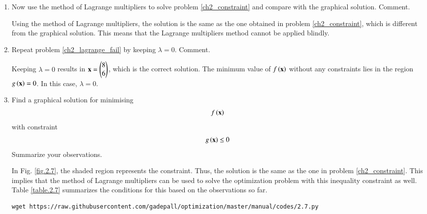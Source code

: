 \documentclass[journal,12pt,twocolumn]{IEEEtran}
\renewcommand\thesection{\arabic{section}}
\begin{document}
\begin{enumerate}[label=\thesection.\arabic*,ref=\thesection.\theenumi]
\solution 
This problem reduces to finding the radius of the smallest circle in the shaded area in Fig. \ref{fig.2.4} .  It is clear that this radius is 0.
%	
\begin{lstlisting}
wget https://raw.githubusercontent.com/gadepall/optimization/master/manual/codes/2.4.py
\end{lstlisting}

%
\begin{figure}[!ht]
\centering
\texttt{[image: ./manual/figs/2.4.eps]}
\caption{ Smallest circle in the shaded region is a point.}
\label{fig.2.4}	
\end{figure}
%
\item
\label{ch2_lagrange_fail}
Now use the method of Lagrange multipliers to solve  problem \ref{ch2_constraint} and compare with the graphical solution.  Comment.

%
\solution Using the method of Lagrange multipliers, the solution is the same as the one obtained in  problem \ref{ch2_constraint}, which is different from the graphical solution.  This means that the Lagrange multipliers method cannot be applied blindly.
\item
Repeat problem \ref{ch2_lagrange_fail} by keeping 
 $\lambda=0$.   Comment.

\solution Keeping $\lambda = 0$ results in $\mathbf{x}=\begin{pmatrix} 8\\ 6\end{pmatrix}$, which is the correct solution.  The minimum value of $f\left(\mathbf{x}\right)$ without any constraints lies in the region $g\left(\mathbf{x}\right) = 0$.  In this case, $\lambda = 0$.  
%
%
\item
\label{ch2_constraint_border}
Find a graphical solution for minimising
\begin{align}
f\left(\mathbf{x}\right)
\end{align}
with constraint
\begin{align}
g\left(\mathbf{x}\right) \leq 0
\end{align}
Summarize your observations.

%
\solution In Fig. \ref{fig.2.7}, the shaded region represents the constraint.  Thus, the solution is the same as the one in problem \ref{ch2_constraint}. This implies that the method of
Lagrange multipliers can be used to solve the optimization problem with this inequality constraint as well.  Table \ref{table.2.7} summarizes the conditions for this based on the observations so far.
\begin{lstlisting}
wget https://raw.githubusercontent.com/gadepall/optimization/master/manual/codes/2.7.py
\end{lstlisting}


\end{enumerate}
\end{document}
